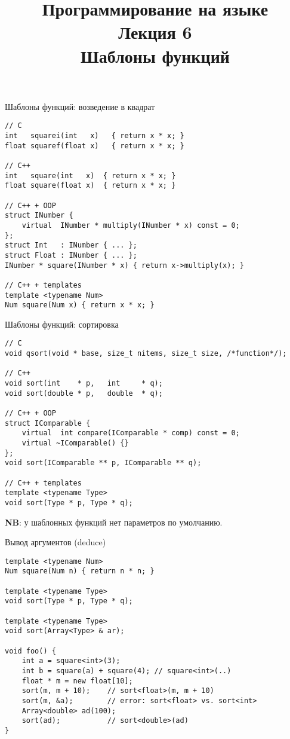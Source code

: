 \documentclass{beamer}
\title{{\bf Программирование на языке \langcpp\protect\\Лекция
6\protect\vspace{1em}\\}Шаблоны функций}
\begin{document}
\begin{frame} 
  \titlepage
\end{frame}

\begin{frame}[fragile]{Шаблоны функций: возведение в квадрат}
\small
    \begin{lstlisting}
// C
int   squarei(int   x)   { return x * x; }
float squaref(float x)   { return x * x; }

// C++
int   square(int   x)  { return x * x; }
float square(float x)  { return x * x; }

// C++ + OOP
struct INumber {
    virtual  INumber * multiply(INumber * x) const = 0;
};
struct Int   : INumber { ... };
struct Float : INumber { ... };
INumber * square(INumber * x) { return x->multiply(x); }

// C++ + templates
template <typename Num>
Num square(Num x) { return x * x; }
    \end{lstlisting}
\end{frame}

\begin{frame}[fragile]{Шаблоны функций: сортировка}
\small
    \begin{lstlisting}
// C
void qsort(void * base, size_t nitems, size_t size, /*function*/);

// C++
void sort(int    * p,   int     * q);
void sort(double * p,   double  * q);

// C++ + OOP
struct IComparable {
    virtual  int compare(IComparable * comp) const = 0;
    virtual ~IComparable() {}
};
void sort(IComparable ** p, IComparable ** q);

// C++ + templates
template <typename Type>
void sort(Type * p, Type * q);
    \end{lstlisting}
{\bf NB}: у шаблонных функций нет параметров по умолчанию.
\end{frame}

\begin{frame}[fragile]{Вывод аргументов (deduce)}
\small
    \begin{lstlisting}
template <typename Num>
Num square(Num n) { return n * n; }

template <typename Type>
void sort(Type * p, Type * q);

template <typename Type>
void sort(Array<Type> & ar); 

void foo() {
    int a = square<int>(3);
    int b = square(a) + square(4); // square<int>(..)
    float * m = new float[10];
    sort(m, m + 10);    // sort<float>(m, m + 10)
    sort(m, &a);        // error: sort<float> vs. sort<int>
    Array<double> ad(100);
    sort(ad);           // sort<double>(ad)
}
    \end{lstlisting}
\end{frame}
\end{document}
